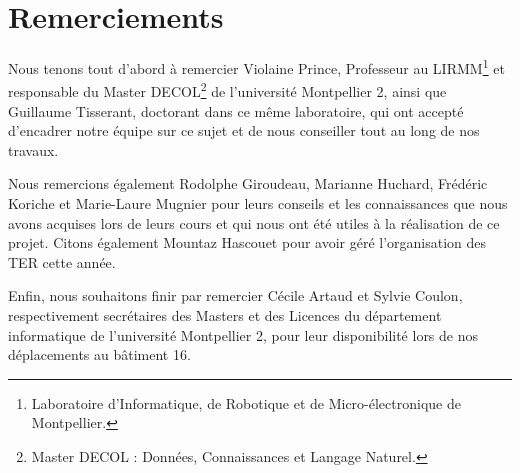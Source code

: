 \chapter*{Remerciements}

Nous tenons tout d'abord à remercier \mbox{Violaine} \mbox{Prince}, Professeur au LIRMM\footnote{Laboratoire d'Informatique, de Robotique et de Micro-électronique de Montpellier.} et responsable du Master DECOL\footnote{Master DECOL : Données, Connaissances et Langage Naturel.} de l'université Montpellier 2, ainsi que \mbox{Guillaume} \mbox{Tisserant}, doctorant dans ce même laboratoire, qui ont accepté d'encadrer notre équipe sur ce sujet et de nous conseiller tout au long de nos travaux.

Nous remercions également \mbox{Rodolphe} \mbox{Giroudeau}, \mbox{Marianne} \mbox{Huchard}, \mbox{Frédéric} \mbox{Koriche} et \mbox{Marie-Laure} \mbox{Mugnier} pour leurs conseils et les connaissances que nous avons acquises lors de leurs cours et qui nous ont été utiles à la réalisation de ce projet. Citons également \mbox{Mountaz} \mbox{Hascouet} pour avoir géré l'organisation des TER cette année.

Enfin, nous souhaitons finir par remercier \mbox{Cécile} \mbox{Artaud} et \mbox{Sylvie} \mbox{Coulon}, respectivement secrétaires des Masters et des Licences du département informatique de l'université Montpellier 2, pour leur disponibilité lors de nos déplacements au bâtiment 16.

